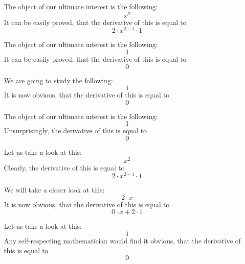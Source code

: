 \documentclass{article}
\begin{document}
The object of our ultimate interest is the following:
\begin{equation}
x ^{2 } 
\end{equation}
It can be easily proved, that the derivative of this is equal to
\begin{equation}
2 \cdot x ^{2 - 1 } \cdot 1 
\end{equation}

The object of our ultimate interest is the following:
\begin{equation}
1 
\end{equation}
It can be easily proved, that the derivative of this is equal to
\begin{equation}
0 
\end{equation}

We are going to study the following:
\begin{equation}
1 
\end{equation}
It is now obvious, that the derivative of this is equal to
\begin{equation}
0 
\end{equation}

The object of our ultimate interest is the following:
\begin{equation}
1 
\end{equation}
Unsurprisingly, the derivative of this is equal to
\begin{equation}
0 
\end{equation}

Let us take a look at this:
\begin{equation}
x ^{2 } 
\end{equation}
Clearly, the derivative of this is equal to
\begin{equation}
2 \cdot x ^{2 - 1 } \cdot 1 
\end{equation}

We will take a closer look at this:
\begin{equation}
2 \cdot x 
\end{equation}
It is now obvious, that the derivative of this is equal to
\begin{equation}
0 \cdot x + 2 \cdot 1 
\end{equation}

Let us take a look at this:
\begin{equation}
1 
\end{equation}
Any self-respecting mathematician would find it obvious, that the derivative of this is equal to
\begin{equation}
0 
\end{equation}
\end{document}
